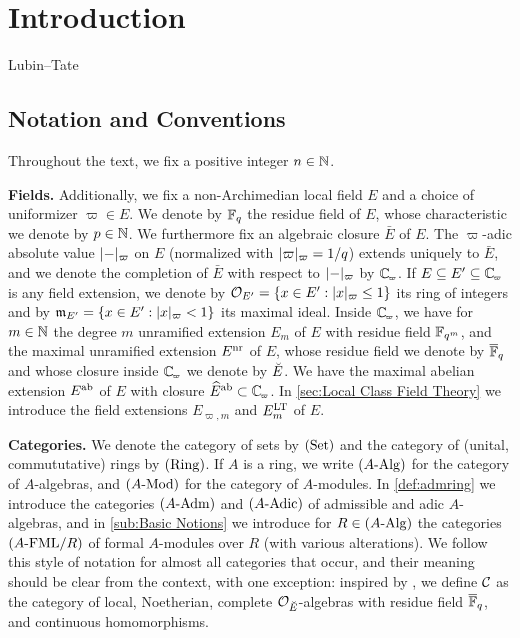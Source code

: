 \documentclass[../main.tex]{subfiles}
\begin{document}
\section*{Introduction} %

Lubin--Tate 

\subsection*{Notation and Conventions} %
Throughout the text, we fix a positive integer $n \in \mathbb{N}$.

\textbf{Fields.} Additionally, we fix a non-Archimedian local field $E$
and a choice of uniformizer $\varpi \in E$. We denote by $\mathbb{F}_q$ the residue
field of $E$, whose characteristic we denote by $p \in \mathbb{N}$. We furthermore fix
an algebraic closure $\bar E$ of $E$. The $\varpi$-adic absolute value $\lvert - \rvert_\varpi$ on $E$ (normalized with $\lvert \varpi \rvert_\varpi = 1/q$) extends uniquely
to $\bar E$, and we denote the completion of $\bar E$ with respect to $\lvert - \rvert_\varpi$ by $\Cp$. If $E \subseteq E' \subseteq \Cp$ is any
field extension, we denote by $\mathcal{O}_{E'} = \{x \in E' : \lvert x \rvert_\varpi \leq 1\}$
its ring of integers and by $\mathfrak{m}_{E'} = \{x \in E' : \lvert x \rvert_{\varpi} < 1\}$ its
maximal ideal. Inside $\Cp$, we have for $m\in \mathbb{N}$ the degree $m$ unramified
extension $E_m$ of $E$ with residue field $\mathbb{F}_{q^m}$, and the maximal unramified extension
$E^{\mathrm{nr}}$ of $E$, whose residue field we denote by ${\overline {\mathbb{F}}_q}$ and whose closure
inside $\Cp$ we denote by ${\breve {E}}$. We have the maximal abelian extension $E^{\mathrm{ab}}$ of 
$E$ with closure $\hat E^\ab \subset \Cp$. In \cref{sec:Local Class Field Theory} we 
introduce the field extensions $E_{\varpi, m}$ and $E^{\mathrm{LT}}_m$ of $E$.

\textbf{Categories.} 
We denote the category of sets by ${(\mathrm{Set})}$ and the category of (unital,
commututative) rings by ${(\mathrm{Ring})}$. If $A$ is a ring, we write ${({A}\textnormal-\allowbreak\mathrm{Alg})}$ for the
category of $A$-algebras, and ${({A}\textnormal-\allowbreak\mathrm{Mod})}$ for the category of $A$-modules.
In \cref{def:admring} we introduce the categories ${({A}\textnormal-\allowbreak\mathrm{Adm})}$ and ${({A}\textnormal-\allowbreak\mathrm{Adic})}$ of 
admissible and adic $A$-algebras, and in \cref{sub:Basic Notions} we introduce 
for $R \in {({A}\textnormal-\allowbreak\mathrm{Alg})}$ the categories ${({A}\textnormal-\allowbreak\mathrm{FML}/{R})}$ of formal $A$-modules over $R$
(with various alterations). We follow this style of notation for almost all categories
that occur, and their meaning should be clear from the context, with one exception:
inspired by \cite{drinfel1974elliptic}, we define $\mathcal{C}$ as the category of
local, Noetherian, complete $\mathcal{O}_{\breve {E}}$-algebras with residue field ${\overline {\mathbb{F}}_q}$,
and continuous homomorphisms.
\end{document}
